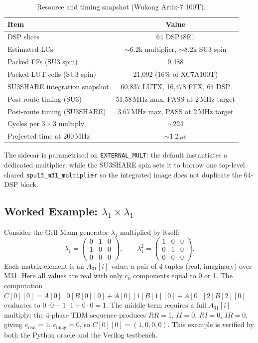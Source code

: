 \documentclass[conference]{IEEEtran}
\begin{document}
\begin{table}[ht]
\centering
\caption{Resource and timing snapshot (Wukong Artix-7 100T).}
\label{tab:resources}
\footnotesize
\setlength{\tabcolsep}{3pt}
\begin{tabular}{lc}
\toprule
Item & Value \\
\midrule
DSP slices & 64 DSP48E1 \\
Estimated LCs & $\sim$6.2k multiplier, $\sim$8.2k SU3 spin \\
Packed FFs (SU3 spin) & 9,488 \\
Packed LUT cells (SU3 spin) & 21,092 (16\% of XC7A100T) \\
SU3SHARE integration snapshot & 60,837 LUTX, 16,478 FFX, 64 DSP \\
Post-route timing (SU3) & 51.58\,MHz max, PASS at 2\,MHz target \\
Post-route timing (SU3SHARE) & 3.67\,MHz max, PASS at 2\,MHz target \\
Cycles per $3\times3$ multiply & $\sim$224 \\
Projected time at 200\,MHz & $\sim$1.2\,$\mu$s \\
\bottomrule
\end{tabular}
\end{table}

The sidecar is parametrised on \texttt{EXTERNAL\_MULT}: the default
instantiates a dedicated multiplier, while the SU3SHARE spin sets it to
borrow one top-level shared \texttt{spu13\_m31\_multiplier} so the
integrated image does not duplicate the 64-DSP block.

\subsection{Worked Example: $\lambda_1 \times \lambda_1$}

Consider the Gell-Mann generator $\lambda_1$ multiplied by itself:
\begin{equation}
\lambda_1 = \begin{pmatrix} 0&1&0\\ 1&0&0\\ 0&0&0 \end{pmatrix},
\qquad
\lambda_1^2 = \begin{pmatrix} 1&0&0\\ 0&1&0\\ 0&0&0 \end{pmatrix}.
\end{equation}
Each matrix element is an $A_{31}[i]$ value: a pair of 4-tuples
(real, imaginary) over M31. Here all values are real with only $c_0$
components equal to 0 or 1. The computation
$C[0][0] = A[0][0]B[0][0] + A[0][1]B[1][0] + A[0][2]B[2][0]$ evaluates to
$0\cdot0 + 1\cdot1 + 0\cdot0 = 1$. The middle term requires a full
$A_{31}[i]$ multiply: the 4-phase TDM sequence produces $RR=1$, $II=0$,
$RI=0$, $IR=0$, giving $c_{\mathrm{real}}=1$, $c_{\mathrm{imag}}=0$, so
$C[0][0] = (1,0,0,0)$. This example is verified by both the Python oracle
and the Verilog testbench.
\end{document}
